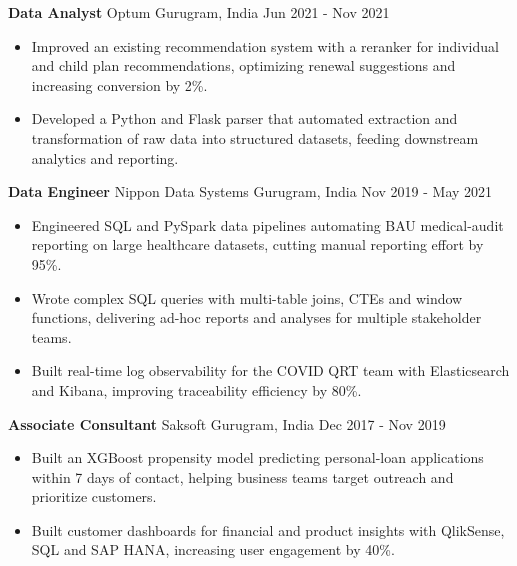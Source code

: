 \documentclass[10pt,a4paper]{article}
\newcommand{\role}[4]{\textbf{#1} \textbar{} #2 \hfill #3 \textbar{} #4\par}
\begin{document}
\vspace{3pt}
\role{Data Analyst}{Optum}{Gurugram, India}{Jun 2021 - Nov 2021}
\begin{itemize}
  \item Improved an existing recommendation system with a reranker for individual and child plan recommendations, optimizing renewal suggestions and increasing conversion by 2\%.
  \item Developed a Python and Flask parser that automated extraction and transformation of raw data into structured datasets, feeding downstream analytics and reporting.
\end{itemize}
\vspace{3pt}
\role{Data Engineer}{Nippon Data Systems}{Gurugram, India}{Nov 2019 - May 2021}
\begin{itemize}
  \item Engineered SQL and PySpark data pipelines automating BAU medical-audit reporting on large healthcare datasets, cutting manual reporting effort by 95\%.
  \item Wrote complex SQL queries with multi-table joins, CTEs and window functions, delivering ad-hoc reports and analyses for multiple stakeholder teams.
  \item Built real-time log observability for the COVID QRT team with Elasticsearch and Kibana, improving traceability efficiency by 80\%.
\end{itemize}
\vspace{3pt}
\role{Associate Consultant}{Saksoft}{Gurugram, India}{Dec 2017 - Nov 2019}
\begin{itemize}
  \item Built an XGBoost propensity model predicting personal-loan applications within 7 days of contact, helping business teams target outreach and prioritize customers.
  \item Built customer dashboards for financial and product insights with QlikSense, SQL and SAP HANA, increasing user engagement by 40\%.
\end{itemize}
\end{document}
